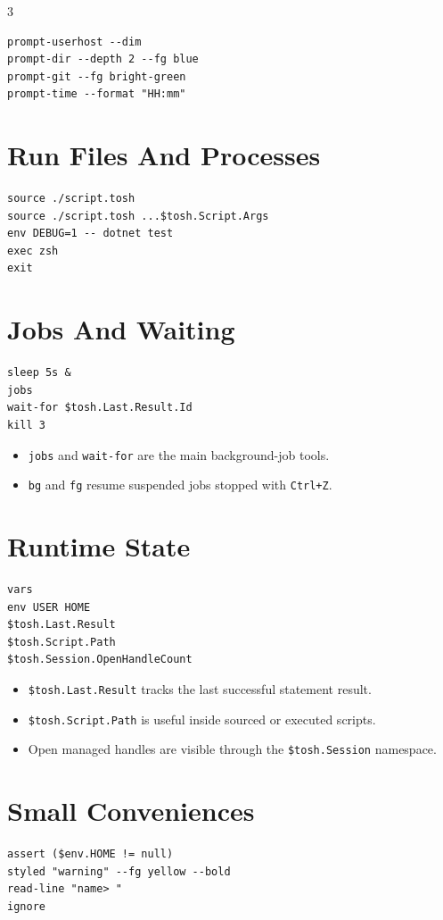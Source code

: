 \begin{multicols*}{3}
\begin{lstlisting}
prompt-userhost --dim
prompt-dir --depth 2 --fg blue
prompt-git --fg bright-green
prompt-time --format "HH:mm"
\end{lstlisting}

\section{Run Files And Processes}
\begin{lstlisting}
source ./script.tosh
source ./script.tosh ...$tosh.Script.Args
env DEBUG=1 -- dotnet test
exec zsh
exit
\end{lstlisting}

\section{Jobs And Waiting}
\begin{lstlisting}
sleep 5s &
jobs
wait-for $tosh.Last.Result.Id
kill 3
\end{lstlisting}

\begin{itemize}
\item \texttt{jobs} and \texttt{wait-for} are the main background-job tools.
\item \texttt{bg} and \texttt{fg} resume suspended jobs stopped with \texttt{Ctrl+Z}.
\end{itemize}

\columnbreak

\section{Runtime State}
\begin{lstlisting}
vars
env USER HOME
$tosh.Last.Result
$tosh.Script.Path
$tosh.Session.OpenHandleCount
\end{lstlisting}

\begin{itemize}
\item \texttt{\$tosh.Last.Result} tracks the last successful statement result.
\item \texttt{\$tosh.Script.Path} is useful inside sourced or executed scripts.
\item Open managed handles are visible through the \texttt{\$tosh.Session} namespace.
\end{itemize}

\section{Small Conveniences}
\begin{lstlisting}
assert ($env.HOME != null)
styled "warning" --fg yellow --bold
read-line "name> "
ignore
\end{lstlisting}


\end{multicols*}
